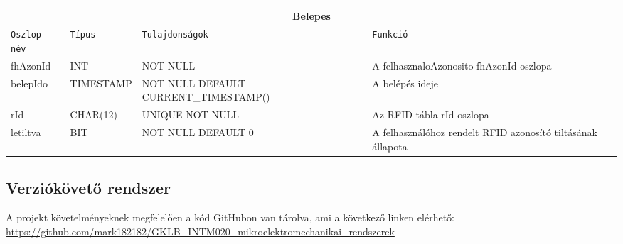 \documentclass[11pt, a4paper]{article}
\begin{document}
				\begin{minipage}{\linewidth}
					\fontsize{10}{16}\selectfont
					\centering
					\begin{tabular}{||m{6em} m{6em} m{12.5em} m{12em}||}
						\hline
						\multicolumn{4}{|c|}{\textbf{Belepes}} \\
						\hline
						\texttt{Oszlop név} & \texttt{Típus} & \texttt{Tulajdonságok} & \texttt{Funkció} \\
						\hline\hline
						fhAzonId & INT & NOT NULL & A felhasznaloAzonosito fhAzonId oszlopa \\ 
						\hline
						belepIdo & TIMESTAMP & NOT NULL\newline{} DEFAULT CURRENT\_TIMESTAMP() & A belépés ideje \\ 
						\hline
						rId & CHAR(12) & UNIQUE NOT NULL & Az RFID tábla rId oszlopa \\ 
						\hline
						letiltva & BIT & NOT NULL DEFAULT 0 & A felhasználóhoz rendelt RFID azonosító tiltásának állapota \\
						\hline
					\end{tabular}
					\label{table:4}
				\end{minipage}
			
		\subsection{Verziókövető rendszer}
			\begin{flushleft}
				\justifying
				A projekt követelményeknek megfelelően a kód GitHubon van tárolva, ami a következő linken elérhető:
				 \url{https://github.com/mark182182/GKLB_INTM020_mikroelektromechanikai_rendszerek}
			\end{flushleft}
			
\end{document}
